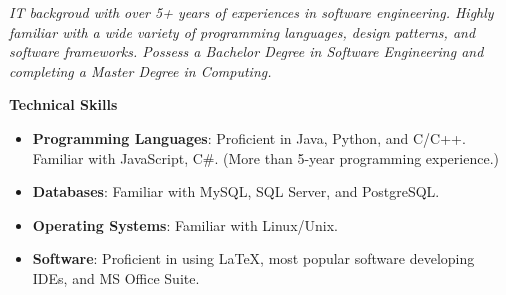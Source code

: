 \documentclass{res}
\newcommand{\resheading}[1]{{\normalsize \colorbox{mygrey}{\begin{minipage}{\textwidth}{\textbf{#1 \vphantom{p\^{E}}}}\end{minipage}}}}
\begin{document}
\begin{resume}
\begin{CJK*}{UTF8}{song}
\normalsize

\vspace*{-0.8cm}
\textit{IT backgroud with over 5+ years of experiences in software engineering. Highly familiar with a wide variety of programming languages, design patterns, and software frameworks. Possess a Bachelor Degree in Software Engineering and completing a Master Degree in Computing.}

%



%

\resheading{Technical Skills}
\begin{itemize}
\itemsep -2pt %
  \item{\bf Programming Languages}: Proficient in Java, Python, and C/C++. Familiar with JavaScript, C\#. (More than 5-year programming experience.)
  \item{\bf Databases}: Familiar with MySQL, SQL Server, and PostgreSQL.
  \item{\bf Operating Systems}: Familiar with Linux/Unix.
  \item{\bf Software}: Proficient in using \LaTeX, most popular software developing IDEs, and MS Office Suite.
\end{itemize}




\end{CJK*}
\end{resume}
\end{document}
